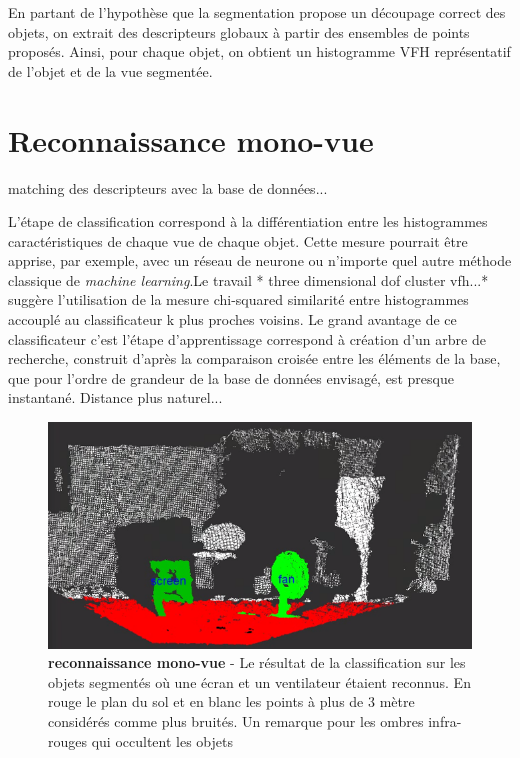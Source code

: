 En partant de l'hypothèse que la segmentation propose un découpage correct des objets, on extrait des descripteurs globaux à partir des ensembles de points proposés. Ainsi, pour chaque objet, on obtient un histogramme VFH représentatif de l'objet et de la vue segmentée.

\section {Reconnaissance mono-vue} 

matching des descripteurs avec la base de données...

L'étape de classification correspond à la différentiation entre les
histogrammes caractéristiques de chaque vue de chaque objet. Cette
mesure pourrait être apprise, par exemple, avec un réseau de neurone
ou n'importe quel autre méthode classique de \textit{machine learning}.{\color{green}Le travail * three dimensional
  dof cluster vfh...* suggère l'utilisation de la mesure chi-squared
  similarité entre histogrammes accouplé au classificateur k plus
  proches voisins. }  Le grand avantage de ce classificateur c'est l'étape
d’apprentissage correspond à création d’un arbre de recherche,
construit d'après la comparaison croisée entre les éléments de la base,
que pour l'ordre de grandeur de la base de données envisagé, est
presque instantané. Distance plus naturel...

\begin{figure}[H]
	\includegraphics[width=\textwidth]{mono_recon.png}
	\caption{\textbf{reconnaissance mono-vue} - Le résultat de la classification sur les objets segmentés où une écran et un ventilateur étaient reconnus. En rouge le plan du sol et en blanc les points à plus de 3 mètre considérés comme plus bruités. Un remarque pour les ombres infra-rouges qui occultent les objets}   
\end{figure}

